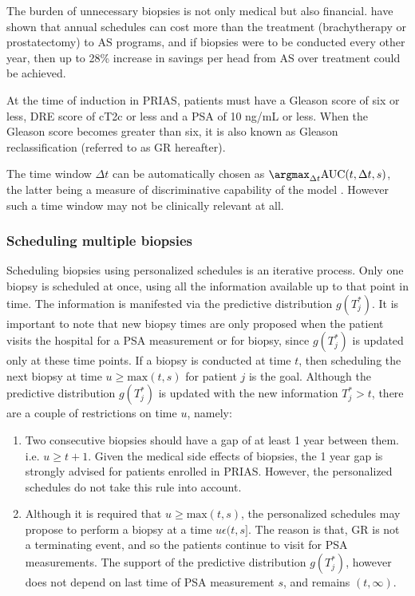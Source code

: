 The burden of unnecessary biopsies is not only medical but also financial. \citet{keegan2012active} have shown that annual schedules can cost more than the treatment (brachytherapy or prostatectomy) to AS programs, and if biopsies were to be conducted every other year, then up to 28\% increase in savings per head from AS over treatment could be achieved.

At the time of induction in PRIAS, patients must have a Gleason score of six or less, DRE score of cT2c or less and a PSA of 10 ng/mL or less. When the Gleason score becomes greater than six, it is also known as Gleason reclassification (referred to as GR hereafter).

The time window $\Delta t$ can be automatically chosen as $\argmax_{\Delta t}\mbox{AUC}(t, \Delta t, s)$, the latter being a measure of discriminative capability of the model \citep{rizopoulosJMbayes,landmarking2017}. However such a time window may not be clinically relevant at all. 

\subsubsection{Scheduling multiple biopsies}
\label{subsubsec : pers_sched_algorithm}
Scheduling biopsies using personalized schedules is an iterative process. Only one biopsy is scheduled at once, using all the information available up to that point in time. The information is manifested via the predictive distribution $g(T^*_j)$. It is important to note that new biopsy times are only proposed when the patient visits the hospital for a PSA measurement or for biopsy, since $g(T^*_j)$ is updated only at these time points. If a biopsy is conducted at time $t$, then scheduling the next biopsy at time $u \geq \text{max}(t,s)$ for patient $j$ is the goal. Although the predictive distribution $g(T^*_j)$ is updated with the new information $T^*_j > t$, there are a couple of restrictions on time $u$, namely:

\begin{enumerate}
\item Two consecutive biopsies should have a gap of at least 1 year between them. i.e. $u \geq t + 1$. Given the medical side effects of biopsies, the 1 year gap is strongly advised for patients enrolled in PRIAS. However, the personalized schedules do not take this rule into account.
\item Although it is required that $u \geq \text{max}(t,s)$, the personalized schedules may propose to perform a biopsy at a time $u \epsilon (t, s]$. The reason is that, GR is not a terminating event, and so the patients continue to visit for PSA measurements. The support of the predictive distribution $g(T^*_j)$, however does not depend on last time of PSA measurement $s$, and remains $(t, \infty)$.
\end{enumerate}
 
